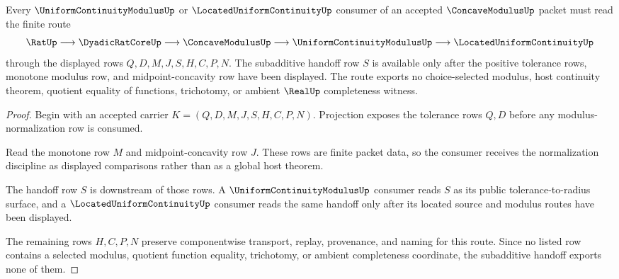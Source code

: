\begin{theorem}
\label{thm:concave-modulus-subadditive-handoff}
Every $\UniformContinuityModulusUp$ or $\LocatedUniformContinuityUp$ consumer of an accepted $\ConcaveModulusUp$ packet must read the finite route
$$
\RatUp \longrightarrow \DyadicRatCoreUp \longrightarrow \ConcaveModulusUp \longrightarrow \UniformContinuityModulusUp \longrightarrow \LocatedUniformContinuityUp
$$
through the displayed rows $Q,D,M,J,S,H,C,P,N$. The subadditive handoff row $S$ is available only after the positive tolerance rows, monotone modulus row, and midpoint-concavity row have been displayed. The route exports no choice-selected modulus, host continuity theorem, quotient equality of functions, trichotomy, or ambient $\RealUp$ completeness witness.
\end{theorem}
\begin{proof}
Begin with an accepted carrier $K=(Q,D,M,J,S,H,C,P,N)$. Projection exposes the tolerance rows $Q,D$ before any modulus-normalization row is consumed.

Read the monotone row $M$ and midpoint-concavity row $J$. These rows are finite packet data, so the consumer receives the normalization discipline as displayed comparisons rather than as a global host theorem.

The handoff row $S$ is downstream of those rows. A $\UniformContinuityModulusUp$ consumer reads $S$ as its public tolerance-to-radius surface, and a $\LocatedUniformContinuityUp$ consumer reads the same handoff only after its located source and modulus routes have been displayed.

The remaining rows $H,C,P,N$ preserve componentwise transport, replay, provenance, and naming for this route. Since no listed row contains a selected modulus, quotient function equality, trichotomy, or ambient completeness coordinate, the subadditive handoff exports none of them.
\end{proof}


